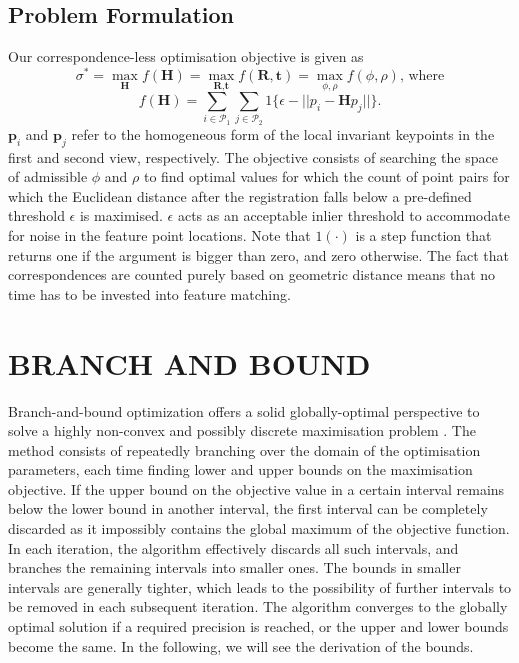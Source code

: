 \documentclass[letterpaper, 10 pt, conference]{ieeeconf}  %
\begin{document}
\subsection{Problem Formulation}

Our correspondence-less optimisation objective is given as
%
\begin{equation}
	\label{optimization}
	\sigma^* = \max\limits_{\textbf{H}} f(\textbf{H}) = \max\limits_{\textbf{R}, \textbf{t}} f(\textbf{R}, \textbf{t}) = \max\limits_{\phi, \rho} f(\phi, \rho) \text{, where} \nonumber
\end{equation}
\begin{equation}
	\label{objective_function}
	f(\textbf{H}) = \sum_{i \in \mathcal{P}_1} \sum_{j \in \mathcal{P}_2} 1\{\epsilon - ||p_{i}-\textbf{H} p_{j}|| \}.
\end{equation}
%
$\mathbf{p}_{i}$ and $\mathbf{p}_{j}$ refer to the homogeneous form of the local invariant keypoints in the first and second view, respectively. The objective consists of searching the space of admissible $\phi$ and $\rho$ to find optimal values for which the count of point pairs for which the Euclidean distance after the registration falls below a pre-defined threshold $\epsilon$ is maximised. $\epsilon$ acts as an acceptable inlier threshold to accommodate for noise in the feature point locations. Note that $1(\cdot)$ is a step function that returns one if the argument is bigger than zero, and zero otherwise. The fact that correspondences are counted purely based on geometric distance means that no time has to be invested into feature matching.


\section{BRANCH AND BOUND}
\label{sec:branch_and_bound}

Branch-and-bound optimization offers a solid globally-optimal perspective to solve a highly non-convex and possibly discrete maximisation problem \cite{land2010automatic}. The method consists of repeatedly branching over the domain of the optimisation parameters, each time finding lower and upper bounds on the maximisation objective. If the upper bound on the objective value in a certain interval remains below the lower bound in another interval, the first interval can be completely discarded as it impossibly contains the global maximum of the objective function. In each iteration, the algorithm effectively discards all such intervals, and branches the remaining intervals into smaller ones. The bounds in smaller intervals are generally tighter, which leads to the possibility of further intervals to be removed in each subsequent iteration. The algorithm converges to the globally optimal solution if a required precision is reached, or the upper and lower bounds become the same. In the following, we will see the derivation of the bounds.
\end{document}

